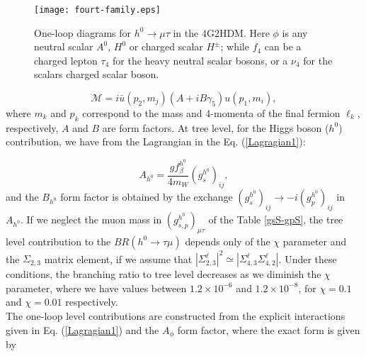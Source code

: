 \documentclass[a4paper]{jpconf}
\begin{document}
\begin{figure}[!hbt]
\centering
\texttt{[image: fourt-family.eps]}
\caption{One-loop diagrams for $h^0 \to \mu \tau$ in the 4G2HDM. Here $ \phi $ is any neutral scalar $ A^{0} $, $ H^{0} $ or charged scalar $ H^{\pm} $; while $f_4$ can be a charged lepton $\tau_4$ for the heavy neutral scalar bosons, or a $\nu_4$ for the scalars charged scalar boson.}
\label{diagrama}
\end{figure}

\begin{equation}
\mathcal{M}=i\bar{u}(p_{2},m_{j})(A+iB\gamma_{5}) u(p_{1},m_{i}),
\label{amplitude-M}
\end{equation}
where $m_k$ and $p_k$ correspond to the mass and 4-momenta of the final fermion $\ell_k$, respectively, $A$ and $B$ are form factors. At tree level, for the Higgs boson ($ h^{0} $) contribution, we have from the Lagrangian in the Eq. (\ref{Lagragian1}):

\begin{equation}
A_{h^0}=\frac{g f_\beta^{h^0}}{4 m_W}(g_s^{h^0})_{ij},
\label{Ah0}
\end{equation}
and the $B_{h^0}$  form factor is obtained by the exchange $(g_s^{h^0})_{ij}\to -i(g_p^{h^0})_{ij}$ in $A_{h^0}$. If we neglect the muon mass in $(g_{s,p}^{h^0})_{\mu\tau}$  of the Table \ref{gsS-gpS}, the tree level contribution to the $BR(h^0\to \tau \mu)$ depends only of the $\chi$ parameter and the $\Sigma_{2,3}$ matrix element, if we assume that $|\Sigma_{2,3}^\ell|^2 \simeq |\Sigma_{4,3}^\ell \Sigma_{4,2}^\ell|$. Under these conditions, the branching ratio to tree level decreases as we diminish the $\chi$ parameter, where we have values between $1.2\times10^{-6}$ and $1.2\times10^{-8}$, for $\chi=0.1$ and $\chi=0.01$ respectively.\\

 The one-loop level contributions are constructed from the explicit interactions given in Eq. (\ref{Lagragian1}) and the $A_{\phi}$ form factor, where the exact form is given by\\
\end{document}
